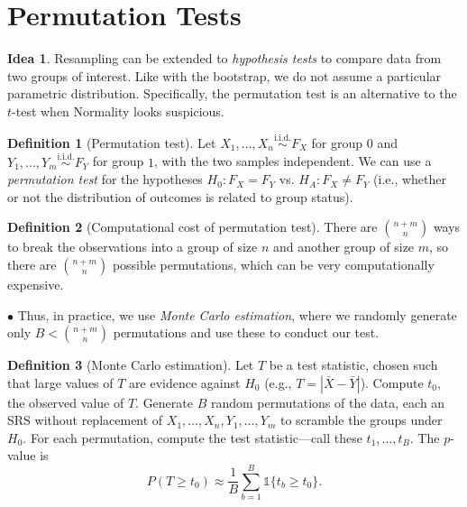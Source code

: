 \documentclass[12pt,oneside]{article}
\newcommand{\simiid}{\overset{\text{i.i.d.}}{\sim}}
\newcommand{\indic}{\mathds{1}}
\theoremstyle{definition}
\newtheorem{definition}{Definition}
\newtheorem*{idea}{Idea}
\theoremstyle{remark}
\begin{document}
\section{Permutation Tests}

\begin{idea}
Resampling can be extended to \textit{hypothesis tests} to compare data from two groups of interest. Like with the bootstrap, we do not assume a particular parametric distribution. Specifically, the permutation test is an alternative to the $t$-test when Normality looks suspicious.
\end{idea}

\begin{definition}[Permutation test]
Let $X_1, \ldots, X_n \simiid F_X$ for group $0$ and $Y_1, \ldots, Y_m \simiid F_Y$ for group $1$, with the two samples independent. We can use a \textit{permutation test} for the hypotheses $H_0: F_X = F_Y$ vs. $H_A: F_X \neq F_Y$ (i.e., whether or not the distribution of outcomes is related to group status).
\end{definition}

\begin{definition}[Computational cost of permutation test]
There are $\binom{n + m}{n}$ ways to break the observations into a group of size $n$ and another group of size $m$, so there are $\binom{n + m}{n}$ possible permutations, which can be very computationally expensive.

$\bullet$ Thus, in practice, we use \textit{Monte Carlo estimation}, where we randomly generate only $B < \binom{n + m}{n}$ permutations and use these to conduct our test.
\end{definition}

\begin{definition}[Monte Carlo estimation]
Let $T$ be a test statistic, chosen such that large values of $T$ are evidence against $H_0$ (e.g., $T = |\bar{X} - \bar{Y}|$). Compute $t_0$, the observed value of $T$. Generate $B$ random permutations of the data, each an SRS without replacement of $X_1, \ldots, X_n, Y_1, \ldots, Y_m$ to scramble the groups under $H_0$. For each permutation, compute the test statistic—call these $t_1, \ldots, t_B$. The $p$-value is \[P(T \geq t_0) \approx \frac{1}{B} \sum_{b = 1}^{B} \indic\{t_b \geq t_0\}.\]
\end{definition}
\end{document}
